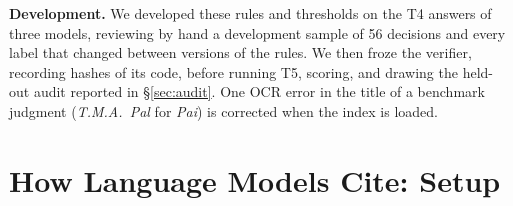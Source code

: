 \documentclass[conference]{IEEEtran}
\begin{document}
\textbf{Development.} We developed these rules and thresholds on the T4 answers of three models, reviewing by hand a development sample of 56 decisions and every label that changed between versions of the rules. We then froze the verifier, recording hashes of its code, before running T5, scoring, and drawing the held-out audit reported in \S\ref{sec:audit}. One OCR error in the title of a benchmark judgment (\emph{T.M.A.\ Pal} for \emph{Pai}) is corrected when the index is loaded.







\section{How Language Models Cite: Setup}
\label{sec:setup}
\end{document}
